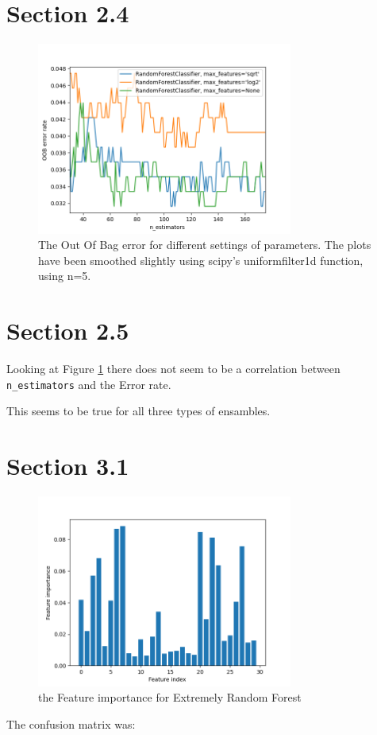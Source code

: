 \documentclass{article}
\begin{document}
\section*{Section 2.4}
\begin{figure}[H]
    \centering
    \includegraphics[width=0.75\textwidth]{09_random_forests/2_4_1.png}
    \caption{The Out Of Bag error for different settings of parameters. The plots have been smoothed slightly using scipy's uniformfilter1d function, using n=5.}
    \label{fig:24}
\end{figure}

\section*{Section 2.5}
Looking at Figure \ref{fig:24} there does not seem to be a correlation between \verb"n_estimators" and the Error rate.

This seems to be true for all three types of ensambles.

\section{Section 3.1}
\begin{figure}[H]
    \centering
    \includegraphics[width=0.75\textwidth]{09_random_forests/3_1_1.png}
    \caption{the Feature importance for Extremely Random Forest}
    \label{fig:31}
\end{figure}
The confusion matrix was:
\end{document}
